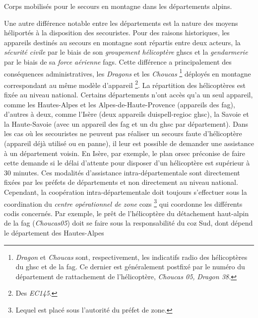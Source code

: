 \begin{table}
  \centering
  
  \caption{Corps mobilisés pour le secours en montagne dans les
    départements alpins.}
  \label{tab:organisation_secours_departements}
\end{table}

Une autre différence notable entre les départements est la nature des
moyens héliportés à la disposition des secouristes. Pour des raisons
historiques, les appareils destinés au secours en montagne sont
répartis entre deux acteurs, la \emph{sécurité civile} par le biais de
son \emph{groupement hélicoptère} \acp{ghsc} et la \emph{gendarmerie}
par le biais de sa \emph{force aérienne} \acp{fag}. Cette différence a
principalement des conséquences administratives, les \emph{Dragons} et
les \emph{Choucas} \footnote{\emph{Dragon} et \emph{Choucas} sont,
  respectivement, les indicatifs radio des hélicoptères du \ac{ghsc}
  et de la \ac{fag}. Ce dernier est généralement postfixé par le
  numéro du département de rattachement de l'hélicoptère, \eg
  \emph{Choucas 05,} \emph{Dragon 38.}} déployés en montagne
correspondant au même modèle d'appareil \footnote{Des
  \emph{EC145}.}. La répartition des hélicoptères est fixée au niveau
national. Certains départements n'ont accès qu'a un seul appareil,
comme les Hautes-Alpes et les Alpes-de-Haute-Provence (appareils des
\ac{fag}), d'autres à deux, comme l'Isère (deux appareils
duispell-regioc \ac{ghsc}), la Savoie et la Haute-Savoie (avec un
appareil des \ac{fag} et un du \ac{ghsc} par département). Dans les
cas où les secouristes ne peuvent pas réaliser un secours faute
d'hélicoptère (appareil déjà utilisé ou en panne), il leur est
possible de demander une assistance à un département voisin. En Isère,
par exemple, le plan \ac{orsec} préconise de faire cette demande si le
délai d'attente pour disposer d'un hélicoptère est supérieur à 30
minutes.
Ces modalités d'assistance intra-départementale sont directement
fixées par les préfets de départements et non directement au niveau
national. Cependant, la coopération intra-départementale doit toujours
s'effectuer sous la coordination du \emph{centre opérationnel de zone}
\acp{coz} \footnote{Lequel est placé sous l'autorité du préfet de
  zone.} qui coordonne les différents \ac{codis} concernés. Par
exemple, le prêt de l'hélicoptère du détachement haut-alpin de la
\ac{fag} (\emph{Choucas05}) doit se faire sous la responsabilité du
\ac{coz} Sud, dont dépend le département des Hautes-Alpes

